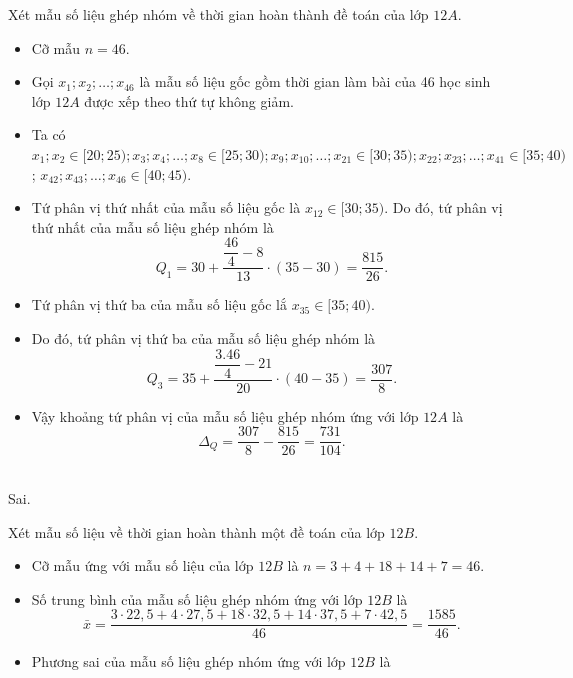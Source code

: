 \begin{ex}
{\begin{itemchoice}
	Xét mẫu số liệu ghép nhóm về thời gian hoàn thành đề toán của lớp $12A$.
\begin{itemize}
	\item 	Cỡ mẫu $n=46$.
	\item Gọi $x_1; x_2; \ldots; x_{46}$ là mẫu số liệu gốc gồm thời gian làm bài của 46 học sinh lớp $12A$ được xếp theo thứ tự không giảm.
		\item 
	Ta có $x_1; x_2 \in[20; 25); x_3; x_4; \ldots; x_8 \in[25; 30); x_9; x_{10}; \ldots; x_{21} \in[30; 35); x_{22}; x_{23}; \ldots; x_{41} \in[35; 40)$; $x_{42}; x_{43}; \ldots; x_{46} \in[40; 45)$.
	\item	Tứ phân vị thứ nhất của mẫu số liệu gốc là $x_{12} \in[30; 35)$. Do đó, tứ phân vị thứ nhất của mẫu số liệu ghép
		nhóm là $$Q_1=30+\dfrac{\dfrac{46}{4}-8}{13} \cdot(35-30)=\dfrac{815}{26}.$$
	\item	Tứ phân vị thứ ba của mẫu số liệu gốc lắ $x_{35} \in[35; 40)$.
	\item 	 Do đó, tứ phân vị thứ ba của mẫu số liệu ghép nhóm là
	$$
	Q_3=35+\dfrac{\dfrac{3.46}{4}-21}{20} \cdot(40-35)=\dfrac{307}{8}.
	$$
	\item	Vậy khoảng tứ phân vị của mẫu số liệu ghép nhóm ứng với lớp $12A$ là $$\Delta_Q=\dfrac{307}{8}-\dfrac{815}{26}=\dfrac{731}{104}.$$\\
\end{itemize}
  \itemch Sai.
  
  Xét mẫu số liệu về thời gian hoàn thành một đề toán của lớp $12B$.
  \begin{itemize}
  	\item 	Cỡ mẫu ứng với mẫu số liệu của lớp $12B$ là $n=3+4+18+14+7=46$.
  	\item   Số trung bình của mẫu số liệu ghép nhóm ứng với lớp $12B$ là
    $$
  \bar{x}=\dfrac{3\cdot 22{,}5+4\cdot 27{,}5+18\cdot 32{,}5+14\cdot 37{,}5+7\cdot 42{,}5}{46}=\dfrac{1585}{46}.
  $$	
  	\item	Phương sai của mẫu số liệu ghép nhóm ứng với lớp $12B$ là
  

\end{itemize}
\end{itemchoice}}
\end{ex}
